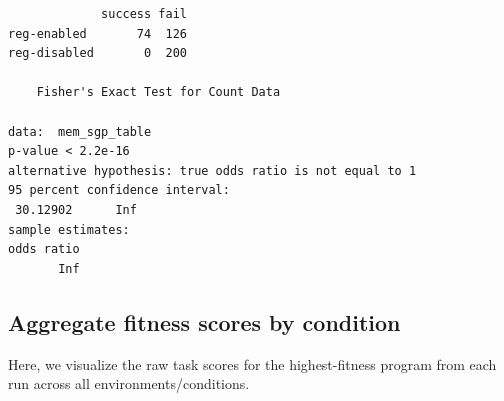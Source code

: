\documentclass[]{book}
\begin{document}
\begin{verbatim}
             success fail
reg-enabled       74  126
reg-disabled       0  200

    Fisher's Exact Test for Count Data

data:  mem_sgp_table
p-value < 2.2e-16
alternative hypothesis: true odds ratio is not equal to 1
95 percent confidence interval:
 30.12902      Inf
sample estimates:
odds ratio 
       Inf 
\end{verbatim}

\hypertarget{aggregate-fitness-scores-by-condition}{%
\subsection{Aggregate fitness scores by condition}\label{aggregate-fitness-scores-by-condition}}

Here, we visualize the raw task scores for the highest-fitness program from each run across all environments/conditions.
\end{document}
